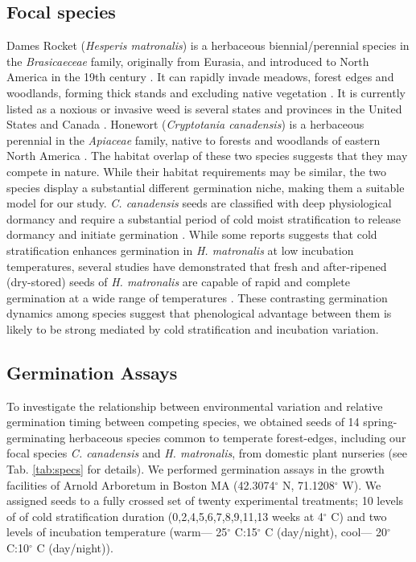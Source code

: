 \documentclass{article}[11pt]
\begin{document}
\subsection*{Focal species}
 Dames Rocket (\textit{Hesperis matronalis}) is a herbaceous biennial/perennial species in the \textit{Brasicaeceae} family, originally from Eurasia, and introduced to North America in the 19th century \citep{Francis:2009wz}. It  can rapidly invade  meadows, forest edges and woodlands, forming thick stands and excluding native vegetation \citep{Francis:2009wz}. It is currently listed as a noxious or invasive weed is several states and provinces in the United States and Canada \citep{Susko:2008ut}. Honewort (\textit{Cryptotania canadensis}) is a herbaceous perennial in the \textit{Apiaceae} family, native to forests and woodlands of eastern North America \citep{Hawkins:2007vb}. The  habitat overlap of these two species suggests that they may compete in nature. While their habitat requirements may be similar, the two species display a substantial different germination niche, making them a suitable model for our study. \textit{C. canadensis} seeds are classified with deep physiological dormancy and require a substantial period of cold moist stratification to release dormancy and initiate germination \citep{Baskin:1988um}. While some reports suggests that cold stratification enhances germination in \textit{H. matronalis} at low incubation temperatures, several studies have demonstrated that fresh and after-ripened (dry-stored) seeds of \textit{H. matronalis} are capable of rapid and complete germination at a wide range of temperatures \citep{Susko:2008ut}. These contrasting germination dynamics among species suggest that phenological advantage between them is likely to be strong mediated by cold stratification and incubation variation.  

\subsection*{Germination Assays}
To investigate the relationship between environmental variation and relative germination timing between competing species, we obtained seeds of 14 spring-germinating herbaceous species common to temperate forest-edges, including our focal species  \textit{C. canadensis} and \textit{H. matronalis}, from domestic plant nurseries (see Tab. \ref{tab:specs} for details). We performed germination assays in the growth facilities of Arnold Arboretum in Boston MA (42.3074$^{\circ}$ N, 71.1208$^{\circ}$ W). We assigned seeds to a fully crossed set of twenty experimental treatments; 10 levels of of cold stratification duration (0,2,4,5,6,7,8,9,11,13 weeks at 4$^{\circ}$ C) and two levels of incubation temperature (warm--- 25$^{\circ}$ C:15$^{\circ}$ C (day/night), cool--- 20$^{\circ}$ C:10$^{\circ}$ C (day/night)).
\end{document}
